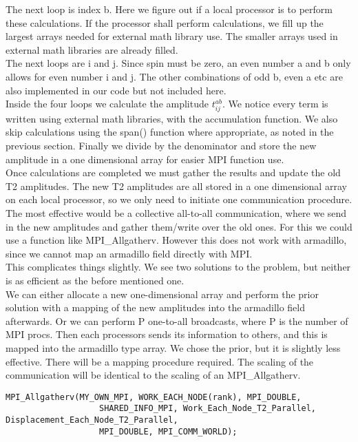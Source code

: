 \documentclass[a4paper,norsk,11pt,twoside]{report}
\begin{document}
The next loop is index b. Here we figure out if a local processor is to perform these calculations. If the processor shall perform calculations, we fill up the largest arrays needed for external math library use. The smaller arrays used in external math libraries are already filled. \\

The next loops are i and j. Since spin must be zero, an even number a and b only allows for even number i and j. The other combinations of odd b, even a etc are also implemented in our code but not included here. \\

Inside the four loops we calculate the amplitude $t_{ij}^{ab}$. We notice every term is written using external math libraries, with the accumulation function. We also skip calculations using the span() function where appropriate, as noted in the previous section. Finally we divide by the denominator and store the new amplitude in a one dimensional array for easier MPI function use. \\

Once calculations are completed we must gather the results and update the old T2 amplitudes. The new T2 amplitudes are all stored in a one dimensional array on each local processor, so we only need to initiate one communication procedure. The most effective would be a collective all-to-all communication, where we send in the new amplitudes and gather them/write over the old ones. For this we could use a function like MPI\_Allgatherv. However this does not work with armadillo, since we cannot map an armadillo field directly with MPI. \\

This complicates things slightly. We see two solutions to the problem, but neither is as efficient as the before mentioned one. \\

We can either allocate a new one-dimensional array and perform the prior solution with a mapping of the new amplitudes into the armadillo field afterwards. Or we can perform P one-to-all broadcasts, where P is the number of MPI procs. Then each processors sends its information to others, and this is mapped into the armadillo type array. We chose the prior, but it is slightly less effective. There will be a mapping procedure required. The scaling of the communication will be identical to the scaling of an MPI\_Allgatherv.

\begin{lstlisting}
MPI_Allgatherv(MY_OWN_MPI, WORK_EACH_NODE(rank), MPI_DOUBLE,
                   SHARED_INFO_MPI, Work_Each_Node_T2_Parallel, Displacement_Each_Node_T2_Parallel,
                   MPI_DOUBLE, MPI_COMM_WORLD);
\end{lstlisting}
\end{document}
